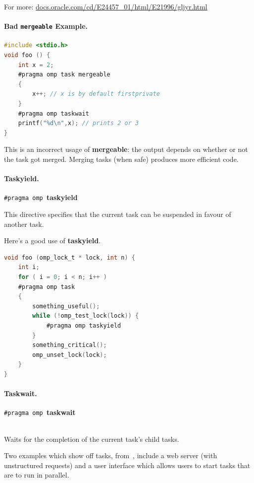 \documentclass[a4paper]{report}
\begin{document}
  For more: \url{docs.oracle.com/cd/E24457_01/html/E21996/gljyr.html}

\paragraph{Bad {\tt mergeable} Example.}

  \begin{lstlisting}[language=C]
#include <stdio.h>
void foo () {
    int x = 2;
    #pragma omp task mergeable
    {
        x++; // x is by default firstprivate
    }
    #pragma omp taskwait
    printf("%d\n",x); // prints 2 or 3
}
  \end{lstlisting}
  
    This is an incorrect usage of {\bf mergeable}: the output depends
      on whether or not the task got merged.
    Merging tasks (when safe) produces more efficient code.

\paragraph{Taskyield.}

  \begin{center}
    {\tt \#pragma omp }{\bf taskyield}
  \end{center}

This directive specifies that the current task can be suspended in favour of another task.

  Here's a good use of {\bf taskyield}.

  \begin{lstlisting}[language=C]
void foo (omp_lock_t * lock, int n) {
    int i;
    for ( i = 0; i < n; i++ )
    #pragma omp task
    {
        something_useful();
        while (!omp_test_lock(lock)) {
            #pragma omp taskyield
        }
        something_critical();
        omp_unset_lock(lock);
    }
}
  \end{lstlisting}

\paragraph{Taskwait.}
  \begin{center}
    {\tt \#pragma omp }{\bf taskwait}
  \end{center}~\\[1em]

     Waits for the completion of the current task's child tasks.

Two examples which show off tasks,
from~\cite{Ayguade:2009:DOT:1512157.1512430}, include a web server (with
unstructured requests) and a user interface which allows users to
start tasks that are to run in parallel.
\end{document}
